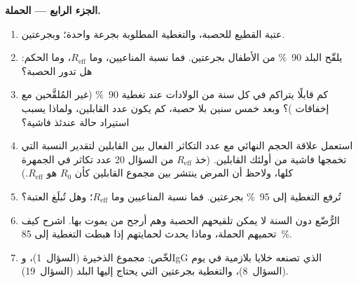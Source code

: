 \begin{problem}
\medskip
\noindent\textbf{الجزء الرابع --- الحملة.}
\begin{enumerate}[resume]
  \item عتبة القطيع للحصبة، والتغطية المطلوبة بجرعة واحدة؛
        وبجرعتين.
  \item يلقّح البلد \qty{90}{\%} من الأطفال بجرعتين. فما
        نسبة المناعيين، وما $R_{\text{eff}}$، وما الحكم: هل
        تدور الحصبة؟
  \item كم قابلًا يتراكم في كل سنة من الولادات عند تغطية
        \qty{90}{\%} (غير المُلقَّحين مع إخفاقات )؟
        وبعد خمس سنين بلا حصبة، كم يكون عدد القابلين، ولماذا
        يسبب استيراد حالة عندئذ فاشية؟
  \item استعمل علاقة الحجم النهائي مع عدد التكاثر الفعال بين
        القابلين لتقدير النسبة التي تخمجها فاشية من أولئك
        القابلين. (خذ $R_{\text{eff}}$ من السؤال 20 عدد تكاثر
        في الجمهرة كلها، ولاحظ أن المرض ينتشر بين مجموع
        القابلين كأن $R_{0}$ هو $R_{\text{eff}}$.)
  \item تُرفع التغطية إلى \qty{95}{\%} بجرعتين. فما نسبة
        المناعيين وما $R_{\text{eff}}$؛ وهل تُبلَغ العتبة؟
  \item الرُّضّع دون السنة لا يمكن تلقيحهم  الحصبة وهم
        أرجح من يموت بها. اشرح كيف تحميهم الحملة، وماذا يحدث
        لحمايتهم إذا هبطت التغطية إلى \qty{85}{\%}.
  \item لخّص: مجموع الذخيرة (السؤال~1)، وIgG الذي تصنعه
        خلايا بلازمية في يوم (السؤال~8)، والتغطية بجرعتين
        التي يحتاج إليها البلد (السؤال~19).
\end{enumerate}
\end{problem}
